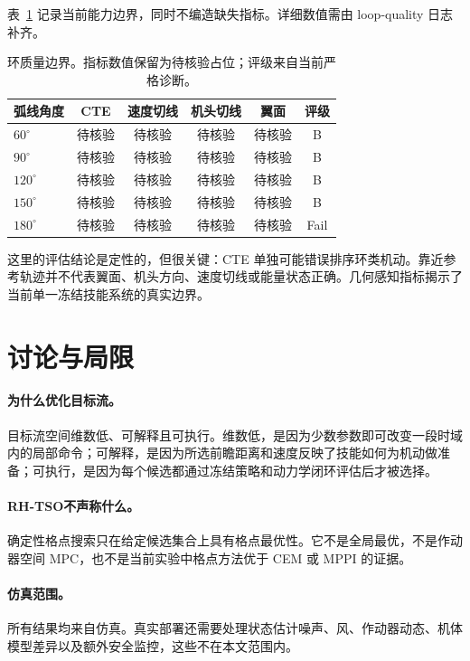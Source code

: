 \documentclass{article}
\newcommand{\rhtso}{RH-TSO}
\begin{document}
表~\ref{tab:loop-frontier-cn} 记录当前能力边界，同时不编造缺失指标。详细数值需由 loop-quality 日志补齐。

\begin{table}[t]
  \caption{环质量边界。指标数值保留为待核验占位；评级来自当前严格诊断。}
  \label{tab:loop-frontier-cn}
  \centering
  \begin{tabular}{lccccc}
    \toprule
    \textbf{弧线角度} & \textbf{CTE} & \textbf{速度切线} & \textbf{机头切线} & \textbf{翼面} & \textbf{评级} \\
    \midrule
    $60^\circ$ & 待核验 & 待核验 & 待核验 & 待核验 & B \\
    $90^\circ$ & 待核验 & 待核验 & 待核验 & 待核验 & B \\
    $120^\circ$ & 待核验 & 待核验 & 待核验 & 待核验 & B \\
    $150^\circ$ & 待核验 & 待核验 & 待核验 & 待核验 & B \\
    $180^\circ$ & 待核验 & 待核验 & 待核验 & 待核验 & Fail \\
    \bottomrule
  \end{tabular}
\end{table}

这里的评估结论是定性的，但很关键：CTE 单独可能错误排序环类机动。靠近参考轨迹并不代表翼面、机头方向、速度切线或能量状态正确。几何感知指标揭示了当前单一冻结技能系统的真实边界。


\section{讨论与局限}

\paragraph{为什么优化目标流。}
目标流空间维数低、可解释且可执行。维数低，是因为少数参数即可改变一段时域内的局部命令；可解释，是因为所选前瞻距离和速度反映了技能如何为机动做准备；可执行，是因为每个候选都通过冻结策略和动力学闭环评估后才被选择。

\paragraph{\rhtso 不声称什么。}
确定性格点搜索只在给定候选集合上具有格点最优性。它不是全局最优，不是作动器空间 MPC，也不是当前实验中格点方法优于 CEM 或 MPPI 的证据。

\paragraph{仿真范围。}
所有结果均来自仿真。真实部署还需要处理状态估计噪声、风、作动器动态、机体模型差异以及额外安全监控，这些不在本文范围内。
\end{document}
